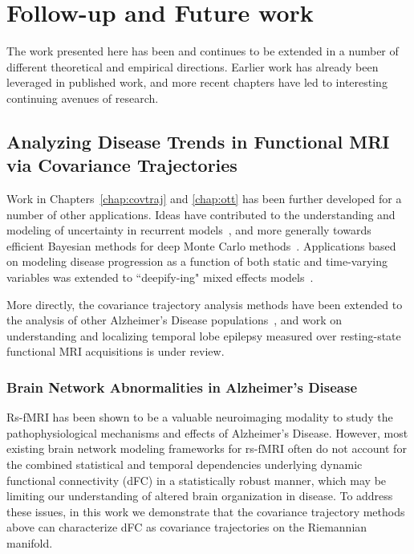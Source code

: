 \chapter{Follow-up and Future work}\label{chap:discuss}

The work presented here has been and continues 
to be extended in a number of different theoretical 
and empirical directions.
Earlier work has already been leveraged in published work,
and more recent chapters
have led to interesting
continuing avenues of research.

\section{Analyzing Disease Trends in Functional MRI via Covariance Trajectories}

Work in Chapters~\ref{chap:covtraj} and \ref{chap:ott} has been further developed for a number of other applications.
Ideas have contributed
to the understanding and modeling of uncertainty
in recurrent models~\citep{spgru},
and more generally towards efficient
Bayesian methods for deep Monte Carlo methods~\citep{mcreparam}.
Applications based on modeling disease progression
as a function of both static and time-varying 
variables was extended to ``deepify-ing" mixed effects models~\citep{deepmem}.

More directly, the covariance trajectory analysis
methods have been extended 
to the analysis of other Alzheimer's Disease populations~\citep{isbi},
and work on understanding and localizing temporal lobe epilepsy
measured over resting-state functional MRI acquisitions is under review.

\subsection{Brain Network Abnormalities in Alzheimer's Disease}
Rs-fMRI has been shown to be a valuable neuroimaging modality to study the pathophysiological mechanisms and effects of Alzheimer's Disease. 
However, most existing brain network modeling frameworks for rs-fMRI often do not account for the combined statistical and temporal dependencies underlying dynamic functional connectivity (dFC) in a statistically robust manner, 
which may be limiting our understanding of altered brain organization in disease.
To address these issues, in this work we demonstrate that
the covariance trajectory methods above can characterize dFC as covariance trajectories on the Riemannian manifold.

